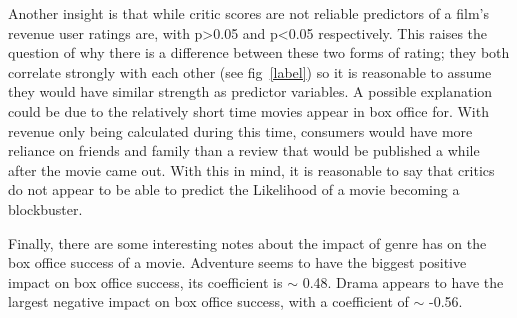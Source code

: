             Another insight is that while critic scores are not reliable predictors of a
                film's revenue user ratings are, with p>0.05 and p<0.05 respectively.
            This raises the question of why there is a difference between these two forms
                of rating; they both correlate strongly with each other (see fig~\ref{label})
                so it is reasonable to assume they would have similar strength as predictor
                variables.
            A possible explanation could be due to the relatively short time movies appear
                in box office for.
            With revenue only being calculated during this time, consumers would have more
                reliance on friends and family than a review that would be published a while
                after the movie came out.
            With this in mind, it is reasonable to say that critics do not appear to be
                able to predict the Likelihood of a movie becoming a blockbuster.

            Finally, there are some interesting notes about the impact of genre has on the
                box office success of a movie.
            Adventure seems to have the biggest positive impact on box office success, its
                coefficient is $\sim$ 0.48.
            Drama appears to have the largest negative impact on box office success, with a
                coefficient of $\sim$ -0.56.

